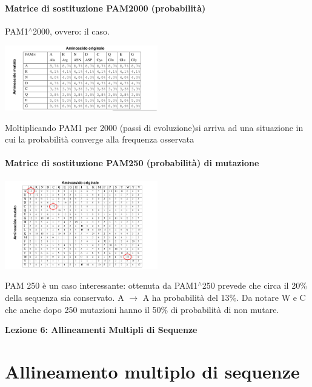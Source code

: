 \documentclass{article}
\begin{document}
\paragraph{Matrice di sostituzione PAM2000 (probabilità)} PAM1$^\wedge$2000, ovvero: il caso.
\begin{center}
    \includegraphics[width=0.5\textwidth]{figures/pam2000.png}\\
\end{center}
Moltiplicando PAM1 per 2000 (passi di
evoluzione)si arriva ad una situazione in cui la
probabilità converge alla frequenza osservata
\paragraph{Matrice di sostituzione PAM250 (probabilità) di mutazione} 
\begin{center}
    \includegraphics[width=0.5\textwidth]{figures/pam250.png}\\
\end{center}
PAM 250 è un caso interessante: ottenuta da PAM1$^\wedge$250 prevede che circa il 20\%
della sequenza sia conservato. A $ \rightarrow$ A ha probabilità del 13\%. Da notare W e C che
anche dopo 250 mutazioni hanno il 50\% di probabilità di non mutare.

\begin{titlepage}
    \begin{center}
        \vspace*{1cm}
        \LARGE
        \textbf{Lezione 6: Allineamenti Multipli di Sequenze}

    \end{center}
\end{titlepage}
\section{Allineamento multiplo di sequenze}
\end{document}
